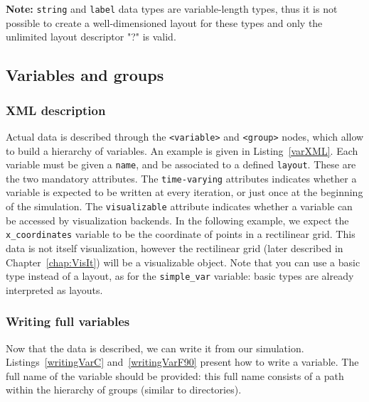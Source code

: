 \documentclass[11pt]{report}
\begin{document}
\textbf{Note:} \texttt{string} and \texttt{label} data types are variable-length types, thus
it is not possible to create a well-dimensioned layout for these types and only the unlimited layout descriptor "?"
is valid.

\subsection{Variables and groups}

\subsubsection{XML description}

Actual data is described through the \texttt{<variable>} and \texttt{<group>} nodes, which
allow to build a hierarchy of variables. An example is given in Listing~\ref{varXML}.
Each variable must be given a \texttt{name}, and be associated to a defined \texttt{layout}.
These are the two mandatory attributes. The \texttt{time-varying} attributes indicates whether
a variable is expected to be written at every iteration, or just once at the beginning of the
simulation. The \texttt{visualizable} attribute indicates whether a variable can be accessed
by visualization backends. In the following example, we expect the \texttt{x\_coordinates} variable
to be the coordinate of points in a rectilinear grid. This data is not itself visualization, however
the rectilinear grid (later described in Chapter~\ref{chap:VisIt}) will be a visualizable object.
Note that you can use a basic type instead of a layout, as for the \texttt{simple\_var} variable: 
basic types are already interpreted as layouts.

\noindent\begin{minipage}{\textwidth}
\vspace{0.5cm}

\end{minipage}

\subsubsection{Writing full variables}

Now that the data is described, we can write it from our simulation. 
Listings~\ref{writingVarC} and~\ref{writingVarF90} present how to write a variable. 
The full name of the variable should be provided: this full name consists of a path within
the hierarchy of groups (similar to directories).
\end{document}
